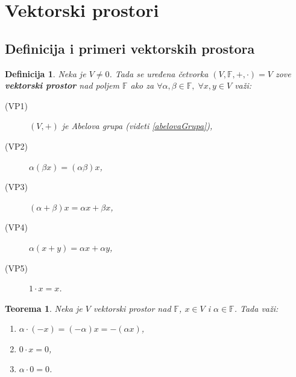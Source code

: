 \documentclass[a4paper,12pt,twoside]{report}
\newtheorem{theorem}{Teorema}[section]
\newtheorem{definition}{Definicija}[section]
\numberwithin{algorithm}{section}
\begin{document}
\section{Vektorski prostori}
\label{vektorskiProstori}
\subsection{Definicija i primeri vektorskih prostora}

\begin{definition}
    Neka je $V \neq 0$. Tada se uređena četvorka $(V, \mathbb{F}, +, \cdot) = V$ zove \textbf{vektorski prostor} nad poljem $\mathbb{F}$ ako za 
    $\forall \alpha, \beta \in \mathbb{F}, \;\forall x,y \in V$ važi:
    \begin{description}
        \item[(VP1)] $(V, +)$ je Abelova grupa (videti \ref{abelovaGrupa}),
        \item[(VP2)] $\alpha (\beta x) = (\alpha \beta)x$,
        \item[(VP3)] $(\alpha + \beta)x = \alpha x + \beta x$,
        \item[(VP4)] $\alpha(x + y) = \alpha x + \alpha y$,
        \item[(VP5)] $1 \cdot x = x$.
    \end{description}
\end{definition}

\begin{theorem}
    Neka je $V$ vektorski prostor nad $\mathbb{F}$, $x \in V$ i $\alpha \in \mathbb{F}$. Tada važi:
    \begin{enumerate}
        \item $\alpha \cdot (-x) = (-\alpha) x = -(\alpha x)$,
        \item $0 \cdot x = 0$,
        \item $\alpha \cdot 0 = 0$.
    \end{enumerate}
\end{theorem}
\end{document}
